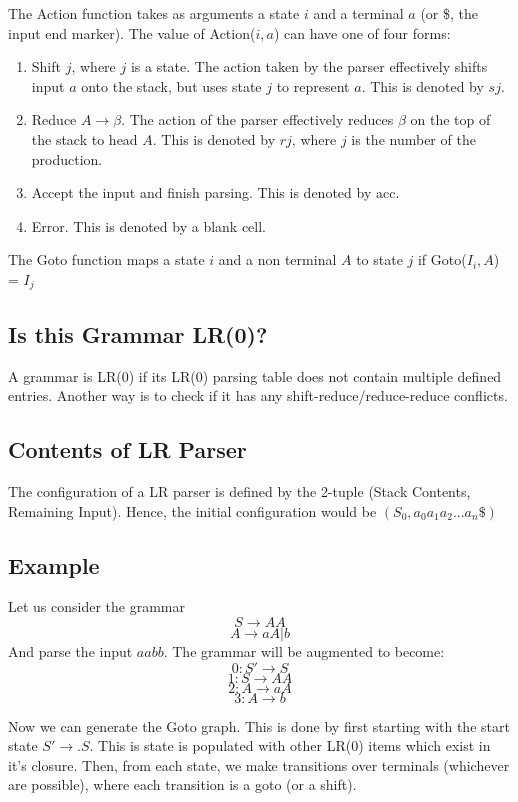 \documentclass[12pt,letterpaper]{amsbook}
\theoremstyle{definition}
\begin{document}
The Action function takes as arguments a state $i$ and a terminal $a$ (or \$, the input end marker). The value of Action($i,a$) can have one of four forms:
\begin{enumerate}
  \item Shift $j$, where $j$ is a state. The action taken by the parser effectively shifts input $a$ onto the stack, but uses state $j$ to represent $a$. This is denoted by $sj$.
  \item Reduce $A \rightarrow \beta$. The action of the parser effectively reduces $\beta$ on the top of the stack to head $A$. This is denoted by $rj$, where $j$ is the number of the production.
  \item Accept the input and finish parsing. This is denoted by acc.
  \item Error. This is denoted by a blank cell.
\end{enumerate}

The Goto function maps a state $i$ and a non terminal $A$ to state $j$ if Goto($I_i,A$) = $I_j$

\subsection{Is this Grammar LR(0)?} 

A grammar is LR(0) if its LR(0) parsing table does not contain multiple defined entries. Another way is to check if it has any shift-reduce/reduce-reduce conflicts.

\subsection{Contents of LR Parser}

The configuration of a LR parser is defined by the 2-tuple (Stack Contents, Remaining Input). Hence, the initial configuration would be $(S_0,a_0a_1a_2...a_n\$)$

\subsection{Example}

Let us consider the grammar
\[S \rightarrow AA\]
\[A \rightarrow aA|b\]
And parse the input $aabb$. The grammar will be augmented to become:
\[0:S' \rightarrow S\]
\[1:S \rightarrow AA\]
\[2:A \rightarrow aA\]
\[3:A \rightarrow b\]

Now we can generate the Goto graph. This is done by first starting with the start state $S' \rightarrow .S$. This is  state is populated with other LR(0) items which exist in it's closure. Then, from each state, we make transitions over terminals (whichever are possible), where each transition is a goto (or a shift).
\end{document}
